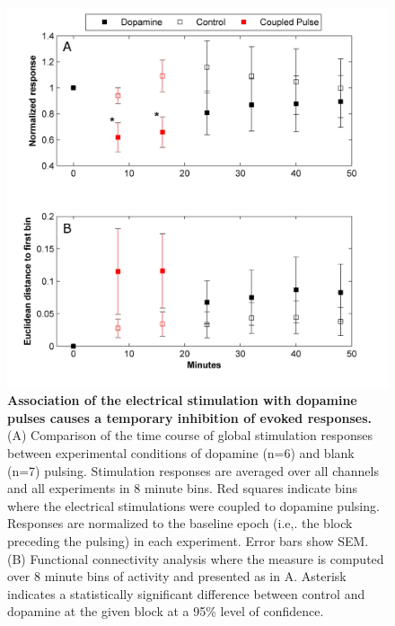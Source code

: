     \begin{figure}[!htb]
       \centering
       \includegraphics[width=15cm]{chapter6/figures/FCStats/FCStats.jpg}
        \caption[Global stimulation response and functional connectivity analysis of the dopamine pulsing experiments]{\textbf{Association of the electrical stimulation with dopamine pulses causes a temporary inhibition of evoked responses.} (A) Comparison of the time course of global stimulation responses between experimental conditions of dopamine (n=6) and blank (n=7) pulsing. Stimulation responses are averaged over all channels and all experiments in 8 minute bins. Red squares indicate bins where the electrical stimulations were coupled to dopamine pulsing. Responses are normalized to the baseline epoch (i.e,. the block preceding the pulsing) in each experiment. Error bars show SEM. (B) Functional connectivity analysis where the measure is computed over 8 minute bins of activity and presented as in A. Asterisk indicates a statistically significant difference between control and dopamine at the given block at a 95\% level of confidence.}
       \label{fig:pulses:FCStats}

  \end{figure}


